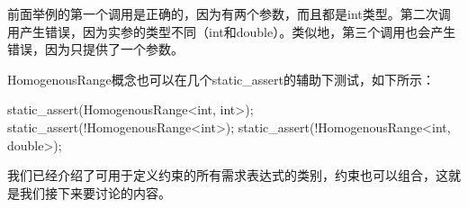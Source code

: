 前面举例的第一个调用是正确的，因为有两个参数，而且都是int类型。第二次调用产生错误，因为实参的类型不同（int和double）。类似地，第三个调用也会产生错误，因为只提供了一个参数。

HomogenousRange概念也可以在几个static\_assert的辅助下测试，如下所示：

\begin{cpp}
static_assert(HomogenousRange<int, int>);
static_assert(!HomogenousRange<int>);
static_assert(!HomogenousRange<int, double>);
\end{cpp}

我们已经介绍了可用于定义约束的所有需求表达式的类别，约束也可以组合，这就是我们接下来要讨论的内容。
















